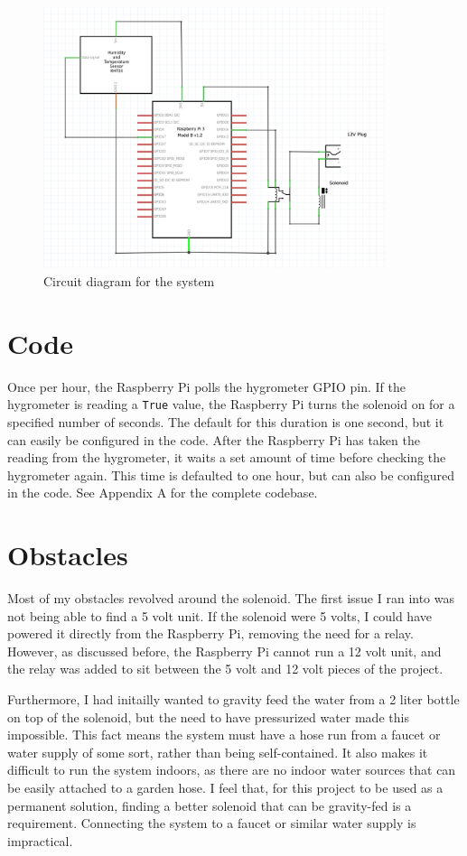 \documentclass[11pt] {article}
\begin{document}
\begin{figure}[H]
    \begin{centering}
        \includegraphics[width=10cm]{../img/circuit}
        \caption{Circuit diagram for the system}
    \end{centering}
\end{figure}

\section{Code}
Once per hour, the Raspberry Pi polls the hygrometer GPIO pin. If the hygrometer is reading a \texttt{True} value, the
Raspberry Pi turns the solenoid on for a specified number of seconds. The default for this duration is one second, but
it can easily be configured in the code. After the Raspberry Pi has taken the reading from the hygrometer, it waits
a set amount of time before checking the hygrometer again. This time is defaulted to one hour, but can also
be configured in the code. See Appendix A for the complete codebase.

\section{Obstacles}
Most of my obstacles revolved around the solenoid. The first issue I ran into was not being able to find a 5 volt unit.
If the solenoid were 5 volts, I could have powered it directly from the Raspberry Pi, removing the need for a relay.
However, as discussed before, the Raspberry Pi cannot run a 12 volt unit, and the relay was added to sit between the
5 volt and 12 volt pieces of the project.

Furthermore, I had initailly wanted to gravity feed the water from a 2 liter bottle on top of the solenoid, but the
need to have pressurized water made this impossible. This fact means the system must have a hose run from a faucet or
water supply of some sort, rather than being self-contained. It also makes it difficult to run the system indoors, as
there are no indoor water sources that can be easily attached to a garden hose. I feel that, for this project to be
used as a permanent solution, finding a better solenoid that can be gravity-fed is a requirement. Connecting the system
to a faucet or similar water supply is impractical.
\end{document}
